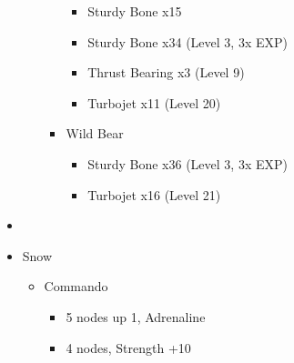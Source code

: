 \begin{multicols}{2}
\begin{upgrade}
\begin{itemize}
\begin{itemize}
\begin{itemize}
            \begin{itemize}
                \item Sturdy Bone x15
                \item Sturdy Bone x34 (Level 3, 3x EXP)
                \item Thrust Bearing x3 (Level 9)
                \item Turbojet x11 (Level 20)
            \end{itemize}
            \item Wild Bear
            \begin{itemize}
                \item Sturdy Bone x36 (Level 3, 3x EXP)
                \item Turbojet x16 (Level 21)
            \end{itemize}
        \end{itemize}
    \end{itemize}
\end{itemize}
\end{upgrade}
\vfill
\begin{menu}
\begin{itemize}
    \paradigm
    \begin{itemize}
        \item {}%
{\paradigmline[1]{\textit{\com}}{\textit{\rav}}{}}%
{\paradigmline{\com}{\med}{}}%
{\paradigmline{\sen}{\med}{}}%
{\paradigmline{\sen}{\syn}{}}%
{\paradigmline{[\rav]}{\rav}{}}%
{\paradigmline{[\rav]}{\rav}{}}
    \end{itemize}
    \crystarium
    \begin{itemize}
        \item Snow
        \begin{itemize}
            \item Commando
            \begin{itemize}
                \item 5 nodes up 1, Adrenaline
                \item 4 nodes, Strength +10
            \end{itemize}
        \end{itemize}
    \end{itemize}
\end{itemize}
\end{menu}
\renewcommand{\first}{[1] Slash \& Burn (\com/\rav)}
\renewcommand{\second}{[2] War \& Peace (\com/\med)}
\renewcommand{\fifth}{[5] Dualcasting (\rav/\rav)}

\end{multicols}
